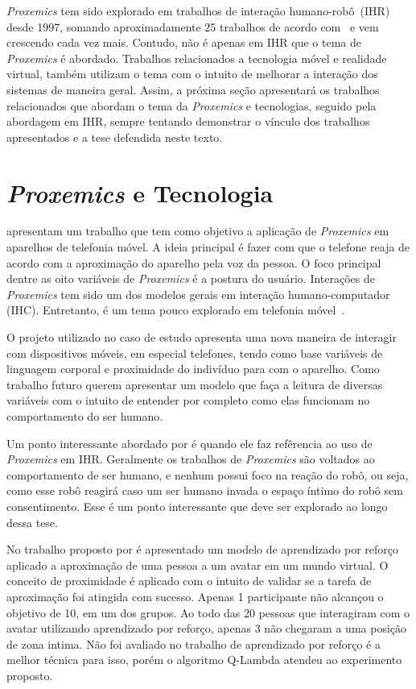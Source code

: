 \emph{Proxemics} tem sido explorado em trabalhos de interação humano-robô~(IHR) desde 1997, somando aproximadamente 25 trabalhos de acordo com~ e vem crescendo cada vez mais. Contudo, não é apenas em IHR que o tema de \emph{Proxemics} é abordado. Trabalhos relacionados a tecnologia móvel e realidade virtual, também utilizam o tema com o intuito de melhorar a interação dos sistemas de maneira geral. Assim, a próxima seção apresentará os trabalhos relacionados que abordam o tema da \emph{Proxemics} e tecnologias, seguido pela abordagem em IHR, sempre tentando demonstrar o vínculo dos trabalhos apresentados e a tese defendida neste texto.

\section{\emph{Proxemics} e Tecnologia}
\label{sec:proxemicstec}
 apresentam um trabalho que tem como objetivo a aplicação de \emph{Proxemics} em aparelhos de telefonia móvel. A ideia principal é fazer com que o telefone reaja de acordo com a aproximação do aparelho pela voz da pessoa. O foco principal dentre as oito variáveis de \emph{Proxemics} é a postura do usuário. Interações de \emph{Proxemics} tem sido um dos modelos gerais em interação humano-computador (IHC). Entretanto, é um tema pouco explorado em telefonia móvel~\cite{Hemmert:2013}.

O projeto utilizado no caso de estudo apresenta uma nova maneira de interagir com dispositivos móveis, em especial telefones, tendo como base variáveis de linguagem corporal e proximidade do indivíduo para com o aparelho. Como trabalho futuro  querem apresentar um modelo que faça a leitura de diversas variáveis com o intuito de entender por completo como elas funcionam no comportamento do ser humano.

Um ponto interessante abordado por  é quando ele faz refêrencia ao uso de \emph{Proxemics} em IHR. Geralmente os trabalhos de \emph{Proxemics} são voltados ao comportamento de ser humano, e nenhum possui foco na reação do robô, ou seja, como esse robô reagirá caso um ser humano invada o espaço íntimo do robô sem consentimento. Esse é um ponto interessante que deve ser explorado ao longo dessa tese.

No trabalho proposto por  é apresentado um modelo de aprendizado por reforço aplicado a aproximação de uma pessoa a um avatar em um mundo virtual. O conceito de proximidade é aplicado com o intuito de validar se a tarefa de aproximação foi atingida com sucesso. Apenas 1 participante não alcançou o objetivo de 10, em um dos grupos. Ao todo das 20 pessoas que interagiram com o avatar utilizando aprendizado por reforço, apenas 3 não chegaram a uma posição de zona intima. Não foi avaliado no trabalho de aprendizado por reforço é a melhor técnica para isso, porém o algoritmo Q-Lambda atendeu ao experimento proposto.

